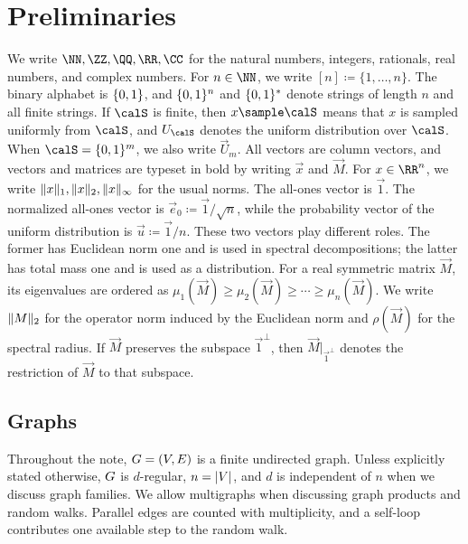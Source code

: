 \section{Preliminaries}
\label{sec:preliminaries}

We write \(\NN,\ZZ,\QQ,\RR,\CC\) for the natural numbers, integers, rationals, real numbers, and complex numbers. For \(n \in \NN\), we write \([n] \coloneqq \{1,\ldots,n\}\). The binary alphabet is \(\{0,1\}\), and \(\{0,1\}^n\) and \(\{0,1\}^*\) denote strings of length \(n\) and all finite strings. If \(\calS\) is finite, then \(x \sample \calS\) means that \(x\) is sampled uniformly from \(\calS\), and \(\vec{U}_{\calS}\) denotes the uniform distribution over \(\calS\). When \(\calS=\bits^m\), we also write \(\vec{U}_m\). All vectors are column vectors, and vectors and matrices are typeset in bold by writing \(\vec{x}\) and \(\vec{M}\). For \(\vec{x} \in \RR^n\), we write \(\lVert x\rVert_1,\lVert x\rVert_2,\lVert x\rVert_\infty\) for the usual norms. The all-ones vector is \(\vec{1}\). The normalized all-ones vector is \(\vec{e}_0 \coloneqq \vec{1}/\sqrt{n}\), while the probability vector of the uniform distribution is \(\vec{u}\coloneqq \vec{1}/n\). These two vectors play different roles. The former has Euclidean norm one and is used in spectral decompositions; the latter has total mass one and is used as a distribution. For a real symmetric matrix \(\vec{M}\), its eigenvalues are ordered as \(\mu_1(\vec{M})\geq \mu_2(\vec{M})\geq \cdots \geq \mu_n(\vec{M})\). We write \(\lVert M\rVert_2\) for the operator norm induced by the Euclidean norm and \(\rho(\vec{M})\) for the spectral radius. If \(\vec{M}\) preserves the subspace \(\vec{1}^{\perp}\), then \(\vec{M}|_{\vec{1}^{\perp}}\) denotes the restriction of \(\vec{M}\) to that subspace.

\subsection{Graphs}
\label{subsec:graphs}

Throughout the note, \(G=(V,E)\) is a finite undirected graph. Unless explicitly stated otherwise, \(G\) is \(d\)-regular, \(n=\lvert V\rvert\), and \(d\) is independent of \(n\) when we discuss graph families. We allow multigraphs when discussing graph products and random walks. Parallel edges are counted with multiplicity, and a self-loop contributes one available step to the random walk.

